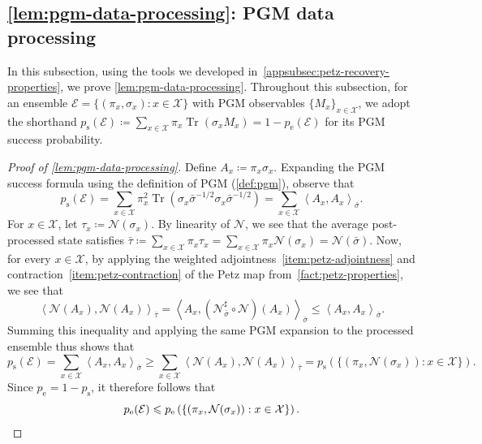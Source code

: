 \documentclass[11pt]{article}
\renewcommand{\leq}{\leqslant}
\renewcommand{\geq}{\geqslant}
\theoremstyle{remark}
\newcommand{\cX}{\mathcal{X}}
\newcommand{\cE}{\mathcal{E}}
\newcommand{\Tr}{\operatorname{Tr}}
\newcommand{\N}{\mathcal{N}}
\newcommand{\inner}[2]{\left\langle #1, #2\right\rangle}
\begin{document}
\subsection{\texorpdfstring{\cref{lem:pgm-data-processing}}{Lemma }: PGM data processing}
\label{appsubsec:proof-pgm-data-processing}

In this subsection, using the tools we developed in~\cref{appsubsec:petz-recovery-properties}, we prove \cref{lem:pgm-data-processing}. Throughout this subsection, for an ensemble $\cE = \{(\pi_x,\sigma_x) : x \in \cX\}$ with PGM observables $\{M_x\}_{x \in \cX}$, we adopt the shorthand $p_{\mathrm{s}}(\cE) \coloneqq \sum_{x \in \cX}{\pi_x\Tr(\sigma_xM_x)} = 1-p_{\mathrm{e}}(\cE)$ for its PGM success probability.

\begin{proof}[Proof of \cref{lem:pgm-data-processing}]
Define $A_x \coloneqq \pi_x \sigma_x$. Expanding the PGM success formula using the definition of PGM (\cref{def:pgm}), observe that
\begin{equation*}
p_{\mathrm{s}}(\cE)
= \sum_{x \in \cX}{\pi_x^2\Tr\left(\sigma_x\bar{\sigma}^{-1/2}\sigma_x\bar{\sigma}^{-1/2}\right)}
= \sum_{x \in \cX}{\inner{A_x}{A_x}_{\bar{\sigma}}}.
\end{equation*}
For $x \in \cX$, let $\tau_x \coloneqq \N(\sigma_x)$. By linearity of $\N$, we see that the average post-processed state satisfies $\bar{\tau} \coloneqq \sum_{x \in \cX}{\pi_x\tau_x} = \sum_{x \in \cX}{\pi_x\N(\sigma_x)} = \N(\bar{\sigma})$. Now, for every $x \in \cX$, by applying the weighted adjointness~\ref{item:petz-adjointness} and contraction~\ref{item:petz-contraction} of the Petz map from~\cref{fact:petz-properties}, we see that
\begin{equation*}
\inner{\N(A_x)}{\N(A_x)}_{\bar{\tau}}
= \inner{A_x}{(\N_{\bar{\sigma}}^\sharp \circ \N)(A_x)}_{\bar{\sigma}}
\leq \inner{A_x}{A_x}_{\bar{\sigma}}.
\end{equation*}
Summing this inequality and applying the same PGM expansion to the processed ensemble thus shows that
\begin{equation*}
p_{\mathrm{s}}(\cE)
= \sum_{x \in \cX}{\inner{A_x}{A_x}_{\bar{\sigma}}}
\geq \sum_{x \in \cX}{\inner{\N(A_x)}{\N(A_x)}_{\bar{\tau}}}
= p_{\mathrm{s}}\left(\{(\pi_x,\N(\sigma_x)) : x \in \cX\}\right).
\end{equation*}
Since $p_{\mathrm{e}} = 1-p_{\mathrm{s}}$, it therefore follows that
\begin{equation*}
p_{\mathrm{e}}(\cE) \leq p_{\mathrm{e}}\left(\{(\pi_x,\N(\sigma_x)) : x \in \cX\}\right).\qedhere
\end{equation*}
\end{proof}
\end{document}
